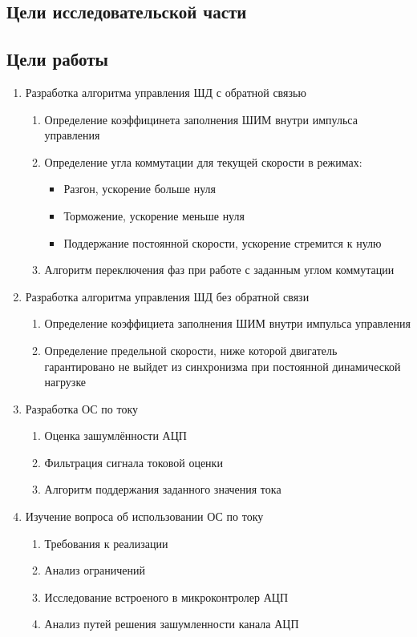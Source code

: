 \ifdefined\DIPLOMA
    \subsection{Цели исследовательской части}
\else
    \subsection{Цели работы}
\fi

\begin{enumerate}
    \item{Разработка алгоритма управления ШД с обратной связью}
    \begin{enumerate}
        \item Определение коэффицинета заполнения ШИМ внутри импульса уп\-рав\-лен\-ия
        \item Определение угла коммутации для текущей скорости в режимах:
            \begin{itemize}
                \item Разгон, ускорение больше нуля
                \item Торможение, ускорение меньше нуля
                \item Поддержание постоянной скорости, ускорение стремится к нулю
            \end{itemize}
        \item Алгоритм переключения фаз при работе с заданным углом коммутации
    \end{enumerate}

    \item{Разработка алгоритма управления ШД без обратной связи}
        \begin{enumerate}
            \item Определение коэффициета заполнения ШИМ внутри импульса уп\-рав\-лен\-ия
            \item Определение предельной скорости, ниже которой двигатель гарантировано не выйдет из
                синхронизма при постоянной динамической нагрузке
        \end{enumerate}

\ifdefined\DIPLOMA
    \item{Разработка ОС по току}
        \begin{enumerate}
            \item Оценка зашумлённости АЦП
            \item Фильтрация сигнала токовой оценки
            \item Алгоритм поддержания заданного значения тока
        \end{enumerate}
\else
    \item{Изучение вопроса об использовании ОС по току}
        \begin{enumerate}
            \item Требования к реализации
            \item Анализ ограничений
            \item Исследование встроеного в микроконтролер АЦП
            \item Анализ путей решения зашумленности канала АЦП
        \end{enumerate}
\fi


\end{enumerate}
